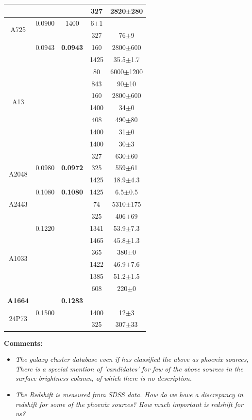 \documentclass[11pt]{report}
\newcommand{\tbf}[1]{\textbf{#1}}
\newcommand{\tit}[1]{\textit{#1}}
\begin{document}
\begin{center}
\begin{tabular}{|c|c|c|c|c|}
&&&327&2820$\pm$280\\
\hline
\multirow{2}{*}{A725} & 0.0900&1400&6$\pm$1\\
&&&327&76$\pm$9\\
\hline
\multirow{10}{*}{A13} & 0.0943 & \tbf{0.0943}&160&2800$\pm$600\\
&&&1425&35.5$\pm$1.7\\
&&&80&6000$\pm$1200\\
&&&843&90$\pm$10\\
&&&160&2800$\pm$600\\
&&&1400&34$\pm$0\\
&&&408&490$\pm$80\\
&&&1400&31$\pm$0\\
&&&1400&30$\pm$3\\
&&&327&630$\pm$60\\
\hline
\multirow{2}{*}{A2048} &0.0980& \tbf{0.0972}&325&559$\pm$61\\
&&&1425&18.9$\pm$4.3\\
\hline
\multirow{3}{*}{A2443} & 0.1080 & \tbf{0.1080}&1425&6.5$\pm$0.5\\
&&&74&5310$\pm$175\\
&&&325&406$\pm$69\\
\hline
\multirow{6}{*}{A1033} & 0.1220&&1341&53.9$\pm$7.3\\
&&&1465&45.8$\pm$1.3\\
&&&365&380$\pm$0\\
&&&1422&46.9$\pm$7.6\\
&&&1385&51.2$\pm$1.5\\
&&&608&220$\pm$0\\
\hline
\tbf{A1664} & &\tbf{0.1283}\\
\hline
\multirow{2}{*}{24P73} & 0.1500 & &1400&12$\pm$3\\
&&&325 &307$\pm$33\\
\hline
\end{tabular}
\end{center}
\tbf{Comments:}
\begin{itemize}
\item \tit{The galaxy cluster database even if has classified the above as phoenix sources, There is a special mention of 'candidates' for few of the above sources in the surface brightness column, of which there is no description.}\\
\item \tit{ The Redshift is measured from SDSS data. How do we have a discrepancy in redshift for some of the phoenix sources? How much important is redshift for us?}
\end{itemize}
\end{document}
